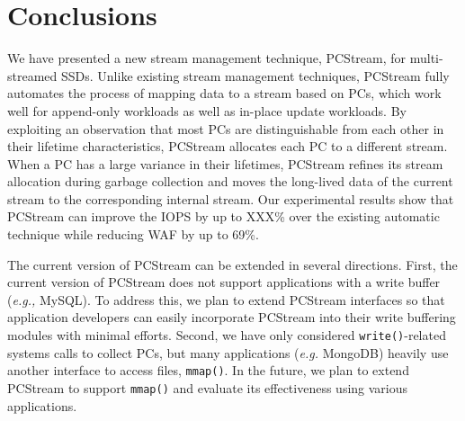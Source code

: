 \section{Conclusions}

We have presented a new stream management technique, \textsf{\small PCStream},
for multi-streamed SSDs.  Unlike existing stream management techniques,
\textsf{\small PCStream} fully automates the process of mapping data to a
stream based on PCs, which work well for append-only workloads as well as
in-place update workloads.  By exploiting an observation that most PCs are
distinguishable from each other in their lifetime characteristics,
\textsf{\small PCStream} allocates each PC to a different stream.  When a PC
has a large variance in their lifetimes, \textsf{\small PCStream} refines its
stream allocation during garbage collection and moves the long-lived data of
the current stream to the corresponding internal stream.  Our experimental
results show that \textsf{\small PCStream} can improve the IOPS by up to XXX\% over 
the existing automatic technique while reducing WAF by up to 69\%. 

The current version of \textsf{\small PCStream} can be extended in several
directions.  First, the current version of PCStream does not support
applications with a write buffer ({\it e.g.,} MySQL). To address this, we plan
to extend PCStream interfaces so that application developers can easily
incorporate PCStream into their write buffering modules with minimal efforts.
Second, we have only considered \texttt{write()}-related systems calls to
collect PCs, but many applications ({\it e.g.} MongoDB) heavily use another
interface to access files, \texttt{mmap()}. In the future, we plan to extend
PCStream to support \texttt{mmap()} and evaluate its effectiveness using
various applications.
